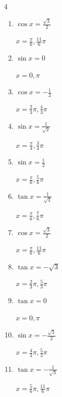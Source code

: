 \begin{multicols}{4}
\begin{enumerate}
        $\displaystyle x = \frac{3}{4}\pi , \frac{7}{4}\pi$

  \item $\displaystyle \cos{x}  = \frac{\sqrt{3}}{2}$

        $\displaystyle x = \frac{\pi}{6} , \frac{11}{6}\pi$

  \item $\displaystyle \sin{x}  = 0$

        $\displaystyle x = 0 , \pi$

  \item $\displaystyle \cos{x}  = -\frac{1}{2}$

        $\displaystyle x = \frac{2}{3}\pi , \frac{4}{3}\pi$

  \item $\displaystyle \sin{x}  = \frac{1}{\sqrt{2}}$

        $\displaystyle x = \frac{\pi}{4} , \frac{3}{4}\pi$

\columnbreak %

  \item $\displaystyle \sin{x}  = \frac{1}{2}$

        $\displaystyle x = \frac{\pi}{6} , \frac{5}{6}\pi$

  \item $\displaystyle \tan{x}  = \frac{1}{\sqrt{3}}$

        $\displaystyle x = \frac{\pi}{6} , \frac{7}{6}\pi$

  \item $\displaystyle \cos{x}  = \frac{\sqrt{3}}{2}$

        $\displaystyle x = \frac{\pi}{6} , \frac{11}{6}\pi$

  \item $\displaystyle \tan{x}  = -\sqrt{3}$

        $\displaystyle x = \frac{2}{3}\pi , \frac{5}{3}\pi$

  \item $\displaystyle \tan{x}  = 0$

        $\displaystyle x = 0 , \pi$

  \item $\displaystyle \sin{x}  = -\frac{\sqrt{3}}{2}$

        $\displaystyle x = \frac{4}{3}\pi , \frac{5}{3}\pi$

  \item $\displaystyle \tan{x}  = -\frac{1}{\sqrt{3}}$

        $\displaystyle x = \frac{5}{6}\pi , \frac{11}{6}\pi$


\end{enumerate}
\end{multicols}
